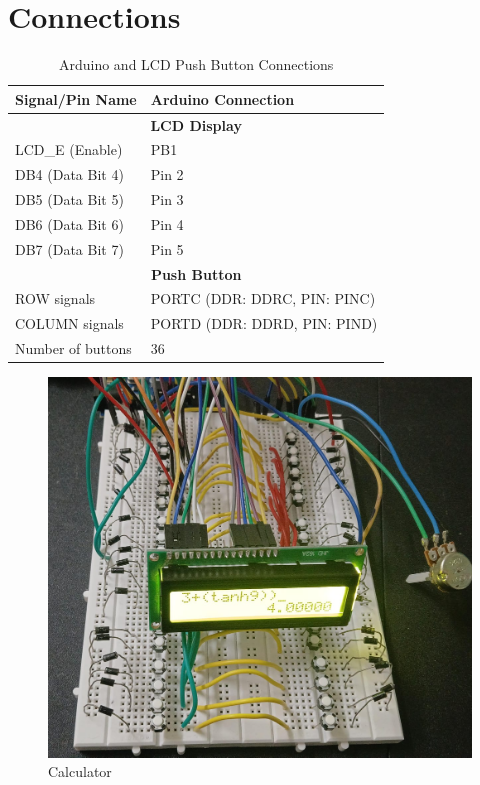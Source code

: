 \documentclass[journal]{IEEEtran}
\numberwithin{equation}{enumi}
\numberwithin{figure}{enumi}
\begin{document}
\section{Connections}
\begin{table}[htbp]
    \centering
    \begin{tabular}{|l|l|}
        \hline
          \textbf{Signal/Pin Name} & \textbf{Arduino Connection} \\
        \hline
        \multicolumn{2}{|c|}{\textbf{LCD Display}} \\
        \hline
        LCD\_E (Enable) & PB1 \\
        \hline
        DB4 (Data Bit 4) & Pin 2 \\
        \hline
         DB5 (Data Bit 5) & Pin 3 \\
        \hline
        DB6 (Data Bit 6) & Pin 4 \\
        \hline
        DB7 (Data Bit 7) & Pin 5 \\
        \hline
        \multicolumn{2}{|c|}{\textbf{Push Button}}\\
        \hline
        ROW signals & PORTC (DDR: DDRC, PIN: PINC) \\
        \hline
         COLUMN signals & PORTD (DDR: DDRD, PIN: PIND) \\
         \hline
         Number of buttons & 36 \\
        \hline
    \end{tabular}
    \caption{Arduino and LCD Push Button Connections}
\end{table}

\newpage
\begin{figure}[H]
    \centering
    \includegraphics[width=0.9\linewidth]{figs/Cal.jpeg}
    \caption{Calculator}
    \label{fig:enter-label}
\end{figure}
\newpage
\end{document}
